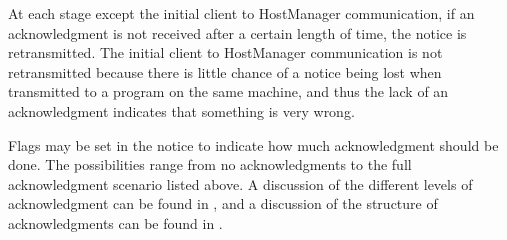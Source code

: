 \noindent At each stage except the initial client to HostManager
communication, if an acknowledgment is not received after a certain 
length of time, the notice is retransmitted.  The initial client to
HostManager communication is not retransmitted because there is little
chance of a notice being lost when transmitted to a program on the
same machine, and thus the lack of an acknowledgment indicates that
something is very wrong.

Flags may be set in the notice to indicate how much acknowledgment
should be done.  The possibilities range from no acknowledgments to the
full acknowledgment scenario listed above.  A discussion of the
different levels of acknowledgment can be found in ,
and a discussion of the structure of acknowledgments can be found in
.
